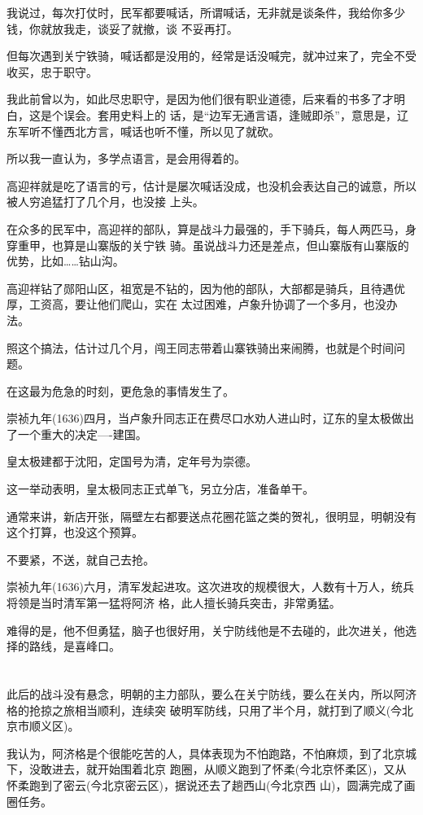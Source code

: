 \documentclass[11pt,a4paper,onecolumn]{article}
\begin{document}
我说过，每次打仗时，民军都要喊话，所谓喊话，无非就是谈条件，我给你多少钱，你就放我走，谈妥了就撤，谈
不妥再打。

但每次遇到关宁铁骑，喊话都是没用的，经常是话没喊完，就冲过来了，完全不受收买，忠于职守。

我此前曾以为，如此尽忠职守，是因为他们很有职业道德，后来看的书多了才明白，这是个误会。套用史料上的
话，是``边军无通言语，逢贼即杀''，意思是，辽东军听不懂西北方言，喊话也听不懂，所以见了就砍。

所以我一直认为，多学点语言，是会用得着的。

高迎祥就是吃了语言的亏，估计是屡次喊话没成，也没机会表达自己的诚意，所以被人穷追猛打了几个月，也没接
上头。

在众多的民军中，高迎祥的部队，算是战斗力最强的，手下骑兵，每人两匹马，身穿重甲，也算是山寨版的关宁铁
骑。虽说战斗力还是差点，但山寨版有山寨版的优势，比如……钻山沟。

高迎祥钻了郧阳山区，祖宽是不钻的，因为他的部队，大部都是骑兵，且待遇优厚，工资高，要让他们爬山，实在
太过困难，卢象升协调了一个多月，也没办法。

照这个搞法，估计过几个月，闯王同志带着山寨铁骑出来闹腾，也就是个时间问题。

在这最为危急的时刻，更危急的事情发生了。

崇祯九年(1636)四月，当卢象升同志正在费尽口水劝人进山时，辽东的皇太极做出了一个重大的决定----建国。

皇太极建都于沈阳，定国号为清，定年号为崇德。

这一举动表明，皇太极同志正式单飞，另立分店，准备单干。

通常来讲，新店开张，隔壁左右都要送点花圈花篮之类的贺礼，很明显，明朝没有这个打算，也没这个预算。

不要紧，不送，就自己去抢。

崇祯九年(1636)六月，清军发起进攻。这次进攻的规模很大，人数有十万人，统兵将领是当时清军第一猛将阿济
格，此人擅长骑兵突击，非常勇猛。

难得的是，他不但勇猛，脑子也很好用，关宁防线他是不去碰的，此次进关，他选择的路线，是喜峰口。

\section[\thesection]{}

此后的战斗没有悬念，明朝的主力部队，要么在关宁防线，要么在关内，所以阿济格的抢掠之旅相当顺利，连续突
破明军防线，只用了半个月，就打到了顺义(今北京市顺义区)。

我认为，阿济格是个很能吃苦的人，具体表现为不怕跑路，不怕麻烦，到了北京城下，没敢进去，就开始围着北京
跑圈，从顺义跑到了怀柔(今北京怀柔区)，又从怀柔跑到了密云(今北京密云区)，据说还去了趟西山(今北京西
山)，圆满完成了画圈任务。
\end{document}
